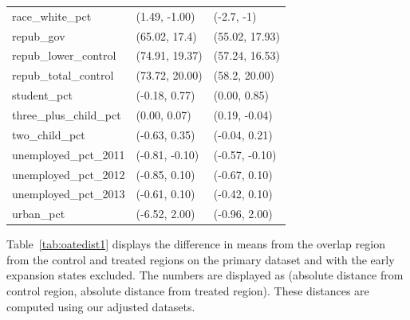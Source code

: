 \documentclass[aoas]{imsart}
\theoremstyle{plain}
\theoremstyle{remark}
\begin{document}
\begin{appendix}
\begin{table}[ht]
\begin{tabular}{lll}
  race\_white\_pct & (1.49, -1.00) & (-2.7, -1) \\ 
  repub\_gov & (65.02, 17.4) & (55.02, 17.93) \\ 
  repub\_lower\_control & (74.91, 19.37) & (57.24, 16.53) \\ 
  repub\_total\_control & (73.72, 20.00) & (58.2, 20.00) \\ 
  student\_pct & (-0.18, 0.77) & (0.00, 0.85) \\ 
  three\_plus\_child\_pct & (0.00, 0.07) & (0.19, -0.04) \\ 
  two\_child\_pct & (-0.63, 0.35) & (-0.04, 0.21) \\ 
  unemployed\_pct\_2011 & (-0.81, -0.10) & (-0.57, -0.10) \\ 
  unemployed\_pct\_2012 & (-0.85, 0.10) & (-0.67, 0.10) \\ 
  unemployed\_pct\_2013 & (-0.61, 0.10) & (-0.42, 0.10) \\ 
  urban\_pct & (-6.52, 2.00) & (-0.96, 2.00) \\ 
   \hline
\end{tabular}
\end{table}

Table~\ref{tab:oatedist1} displays the difference in means from the overlap region from the control and treated regions on the primary dataset and with the early expansion states excluded. The numbers are displayed as (absolute distance from control region, absolute distance from treated region). These distances are computed using our adjusted datasets. 


\end{appendix}
\end{document}
